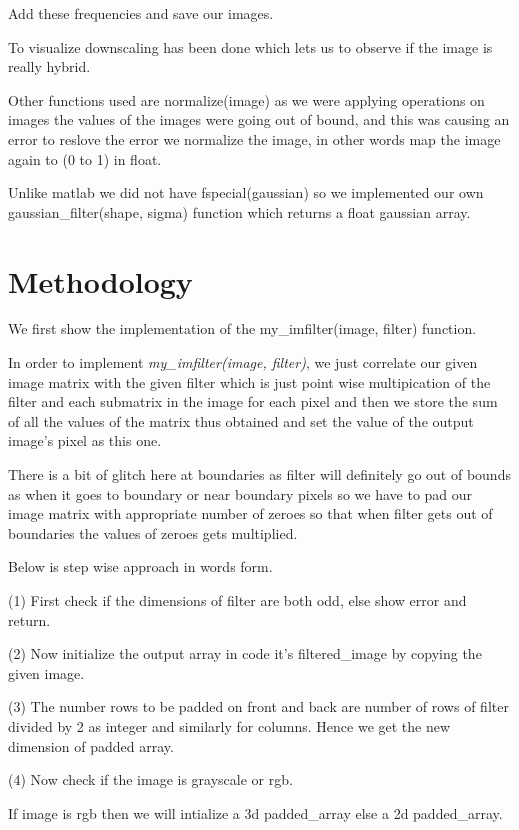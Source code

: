 \documentclass{bmvc2k}
\begin{document}
Add these frequencies and save our images. 

To visualize downscaling has been done which lets us to observe if the image is really hybrid.

Other functions used are normalize(image) as we were applying operations on images the values of the images were going out of bound, and this was causing an error 
to reslove the error we normalize the image, in other words map the image again to (0 to 1) in float.

Unlike matlab we did not have fspecial(gaussian) so we implemented our own gaussian\_filter(shape, sigma) function which returns a float gaussian array. 




\section{Methodology}
\label{sec:Methodology}
We first show the implementation of the my\_imfilter(image, filter) function.

In order to implement \emph{my\_imfilter(image, filter)}, we just correlate our given image matrix with the given filter which is just point wise multipication of the filter and each submatrix in the image for each pixel and then we store the sum of all the values of the matrix thus obtained and set the value of the output image's pixel as this one. 


There is a bit of glitch here at boundaries as filter will definitely go out of bounds as when it goes to boundary or near boundary pixels so we have to pad our image matrix with appropriate number of zeroes so that when filter gets out of boundaries the values of zeroes gets multiplied. 

Below is step wise approach in words form. 

(1) First check if the dimensions of filter are both odd, else show error and return. 

(2) Now initialize the output array in code it's filtered\_image by copying the given image. 

(3) The number rows to be padded on front and back are number of rows of filter divided by 2 as integer and similarly for columns. 
Hence we get the new dimension of padded array. 

(4) Now check if the image is grayscale or rgb. 

  If image is rgb then we will intialize a 3d padded\_array else a 2d padded\_array.
\end{document}
